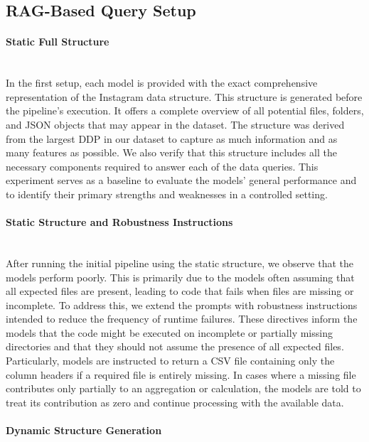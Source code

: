 \documentclass{DESSThesis}
\begin{document}
\subsection{RAG-Based Query Setup}

\paragraph{Static Full Structure}\mbox{}\\

\noindent In the first setup, each model is provided with the exact comprehensive representation of the Instagram data structure. This structure is generated before the pipeline's execution. It offers a complete overview of all potential files, folders, and JSON objects that may appear in the dataset. The structure was derived from the largest DDP in our dataset to capture as much information and as many features as possible. We also verify that this structure includes all the necessary components required to answer each of the data queries. This experiment serves as a baseline to evaluate the models' general performance and to identify their primary strengths and weaknesses in a controlled setting.

\paragraph{Static Structure and Robustness Instructions}\mbox{}\\

\noindent After running the initial pipeline using the static structure, we observe that the models perform poorly. This is primarily due to the models often assuming that all expected files are present, leading to code that fails when files are missing or incomplete. To address this, we extend the prompts with robustness instructions intended to reduce the frequency of runtime failures. These directives inform the models that the code might be executed on incomplete or partially missing directories and that they should not assume the presence of all expected files. Particularly, models are instructed to return a CSV file containing only the column headers if a required file is entirely missing. In cases where a missing file contributes only partially to an aggregation or calculation, the models are told to treat its contribution as zero and continue processing with the available data.

\paragraph{Dynamic Structure Generation}\mbox{}\\
\end{document}
